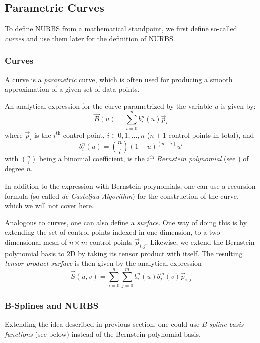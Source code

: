 \subsection{Parametric Curves}
\label{subsec:paracurves}
To define NURBS from a mathematical standpoint, we first define so-called \emph{\Bez curves} and use them later for the definition of NURBS. 
\subsubsection{\Bez Curves}
\label{subsub:bezcurvsurf}
A \Bez curve is a \textit{parametric} curve, which is often used for producing a smooth approximation of a given set of data points.
 
An analytical expression for the \Bez curve parametrized by the variable $u$ is given by:
\begin{equation}
\label{eq:beziercurve}
\vec{B}(u)=\sum\limits_{i=0}^n b_i^n(u) \vec{p}_i
\end{equation}
where $\vec{p}_i$ is the $i^{\text{th}}$ control point, $i\in0,1, \dots ,n$ ($n+1$ control points in total), and
\begin{equation*}
b_i^n(u)=\binom{n}{i}(1-u)^{(n-i)}u^i
\end{equation*}
with $\binom{n}{i}$ being a binomial coefficient, is the $i^{\text{th}}$ \emph{Bernstein polynomial} (see \cite{lorentz2012bernstein}) of degree $n$.

In addition to the expression with Bernstein polynomials, one can use a recursion formula (so-called \emph{de Casteljau Algorithm}) for the construction of the \Bez curve, which we will not cover here. 

Analogous to \Bez curves, one can also define a \textit{\Bez surface}. One way of doing this is by extending the set of control points indexed in one dimension, to a two-dimensional mesh of $n\times m$ control points $\vec{p}_{i,j}$. Likewise, we extend the Bernstein polynomial basis to $2$D by taking its tensor product with itself. The resulting \textit{tensor product \Bez surface} is then given by the analytical expression
\begin{equation}
\label{eq:bezsurface}
\vec{S}(u,v)=\sum\limits_{i=0}^n \sum\limits_{j=0}^m b_i^n(u) b_j^m(v) \vec{p}_{i,j}
\end{equation}

\subsubsection{B-Splines and NURBS}
Extending the idea described in previous section, one could use \emph{B-spline basis functions} (see below) instead of the Bernstein polynomial basis.

